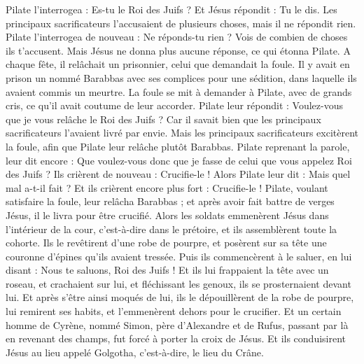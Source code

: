\begin{multicols}{2}
Pilate l'interrogea : Es-tu le Roi des Juifs ? Et Jésus répondit : Tu le dis.
Les principaux sacrificateurs l'accusaient de plusieurs choses, mais il ne répondit rien.
Pilate l'interrogea de nouveau : Ne réponds-tu rien ? Vois de combien de choses ils t’accusent.
Mais Jésus ne donna plus aucune réponse, ce qui étonna Pilate.
A chaque fête, il relâchait un prisonnier, celui que demandait la foule.
Il y avait en prison un nommé Barabbas avec ses complices pour une sédition, dans laquelle ils avaient commis un meurtre.
La foule se mit à demander à Pilate, avec de grands cris, ce qu’il avait coutume de leur accorder.
Pilate leur répondit : Voulez-vous que je vous relâche le Roi des Juifs ?
Car il savait bien que les principaux sacrificateurs l'avaient livré par envie.
Mais les principaux sacrificateurs excitèrent la foule, afin que Pilate leur relâche plutôt Barabbas.
Pilate reprenant la parole, leur dit encore : Que voulez-vous donc que je fasse de celui que vous appelez Roi des Juifs ?
Ils crièrent de nouveau : Crucifie-le !
Alors Pilate leur dit : Mais quel mal a-t-il fait ? Et ils crièrent encore plus fort : Crucifie-le !
Pilate, voulant satisfaire la foule, leur relâcha Barabbas ; et après avoir fait battre de verges Jésus, il le livra pour être crucifié.
Alors les soldats emmenèrent Jésus dans l’intérieur de la cour, c’est-à-dire dans le prétoire, et ils assemblèrent toute la cohorte.
Ils le revêtirent d'une robe de pourpre, et posèrent sur sa tête une couronne d'épines qu’ils avaient tressée.
Puis ils commencèrent à le saluer, en lui disant : Nous te saluons, Roi des Juifs !
Et ils lui frappaient la tête avec un roseau, et crachaient sur lui, et fléchissant les genoux, ils se prosternaient devant lui.
Et après s'être ainsi moqués de lui, ils le dépouillèrent de la robe de pourpre, lui remirent ses habits, et l'emmenèrent dehors pour le crucifier.
Et un certain homme de Cyrène, nommé Simon, père d’Alexandre et de Rufus, passant par là en revenant des champs, fut forcé à porter la croix de Jésus.
Et ils conduisirent Jésus au lieu appelé Golgotha{}, c'est-à-dire, le lieu du Crâne.

\end{multicols}
